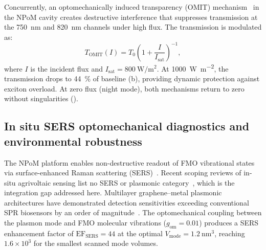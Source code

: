\documentclass[preprint,12pt]{elsarticle}
\begin{document}
Concurrently, an optomechanically induced transparency (OMIT) mechanism~\cite{Aspelmeyer2014} in the NPoM cavity creates destructive interference that suppresses transmission at the \qty{750}{\nm} and \qty{820}{\nm} channels under high flux.
The transmission is modulated as:
\begin{equation}
T_{\mathrm{OMIT}}(I) = T_0 \left(1 + \frac{I}{I_{\mathrm{sat}}}\right)^{-1},
\label{eq:omit}
\end{equation}
where $I$ is the incident flux and $I_{\mathrm{sat}} = \qty{800}{\W\per\m\squared}$.
At \qty{1000}{\W\per\m\squared}, the transmission drops to \qty{44}{\percent} of baseline (b), providing dynamic protection against exciton overload.
At zero flux (night mode), both mechanisms return to zero without singularities ().

\subsection*{In situ SERS optomechanical diagnostics and environmental robustness}

The NPoM platform enables non-destructive readout of FMO vibrational states via surface-enhanced Raman scattering (SERS)~\cite{Langer2020}. Recent scoping reviews of in-situ agrivoltaic sensing list no SERS or plasmonic category~\cite{DiDomenico2026}, which is the integration gap addressed here.
Multilayer graphene--metal plasmonic architectures have demonstrated detection sensitivities exceeding conventional SPR biosensors by an order of magnitude~\cite{Bahmani2026}.
The optomechanical coupling between the plasmon mode and FMO molecular vibrations ($g_{\mathrm{om}} = 0.01$) produces a SERS enhancement factor of $\mathrm{EF}_{\mathrm{SERS}} = 44$ at the optimal $V_{\mathrm{mode}} = \qty{1.2}{\nm\cubed}$, reaching $1.6\times10^{3}$ for the smallest scanned mode volumes.
\end{document}
